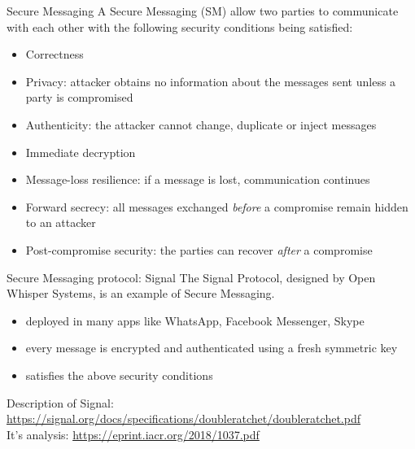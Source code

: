 \documentclass[usenames,dvipsnames, 9pt]{beamer}
\begin{document}
\begin{frame}{Secure Messaging}
	\Large
	A {\color{Orange} Secure Messaging} (SM) allow two parties to communicate with each other with the following security conditions being satisfied:
	\large
	\pause
	\begin{itemize}
		\itemsep5pt
		\item {\color{Orange}Correctness}
		\item {\color{Orange} Privacy:} attacker obtains no information about the messages sent unless a party is compromised
		\item {\color{Orange} Authenticity:} the attacker cannot change, duplicate or inject messages
		\item  {\color{Orange} Immediate  decryption}
		\item {\color{Orange}  Message-loss resilience:} if a message is lost, communication continues
		\item {\color{Orange} Forward secrecy:} all messages exchanged \emph{before} a compromise remain hidden to an attacker
		\item {\color{Orange} Post-compromise security: } the parties can recover \emph{after} a compromise
	\end{itemize}
	\centering
\end{frame}

\begin{frame}{Secure Messaging protocol: Signal}
	\Large
	{\color{Orange} The Signal Protocol}, designed by Open Whisper Systems, is an example of Secure Messaging.
	\vspace{20pt}
	\large
	\begin{itemize}
		\itemsep 7pt
		\item deployed in many apps like WhatsApp, Facebook Messenger, Skype
		\item every message is encrypted and authenticated using a fresh symmetric key
		\item satisfies the above security conditions
	\end{itemize}
	\vspace{30pt}
\small 
Description of Signal: \url{https://signal.org/docs/specifications/doubleratchet/doubleratchet.pdf} \\[5pt]
It's analysis: \url{https://eprint.iacr.org/2018/1037.pdf} 
\end{frame}
\end{document}
